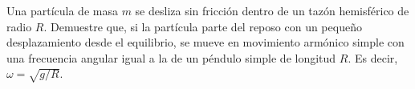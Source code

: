 \item Una partícula de masa $m$ se desliza sin fricción dentro de un tazón hemisférico de radio $R$. Demuestre que, si la partícula parte del reposo con un pequeño desplazamiento desde el equilibrio, se mueve en movimiento armónico simple con una frecuencia angular igual a la de un péndulo simple de longitud $R$. Es decir, $\omega = \sqrt{g/R}$.